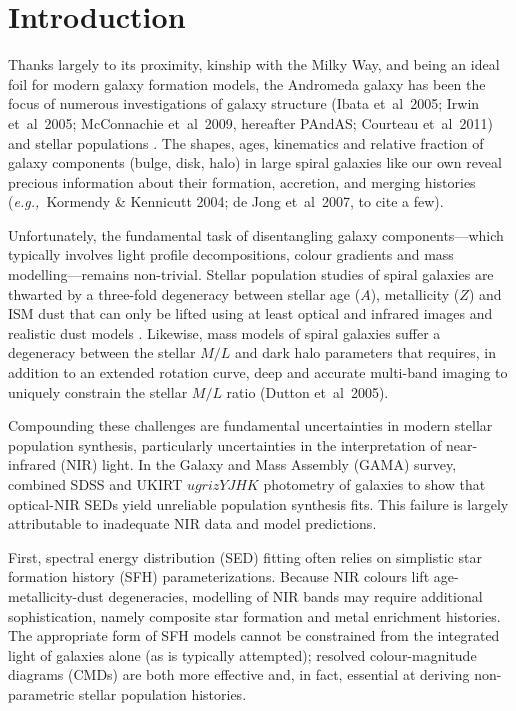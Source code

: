 \documentclass[iop]{emulateapj}
\newcommand{\eg}{\textit{e.g.,~}}
\newcommand{\etal}{et~al~}
\begin{document}
\section{Introduction}
\label{sec:intro}

Thanks largely to its proximity, kinship with the Milky Way, and being an ideal foil for modern galaxy formation models, the Andromeda galaxy has been the focus of numerous investigations of galaxy structure (Ibata \etal 2005; Irwin \etal 2005; McConnachie \etal 2009, hereafter PAndAS; Courteau \etal 2011) and stellar populations \citep{Williams:2002,Worthey:2005,Saglia:2010}.
The shapes, ages, kinematics and relative fraction of galaxy components (bulge, disk, halo) in large spiral galaxies like our own reveal precious information about their formation, accretion, and merging histories (\eg Kormendy \& Kennicutt 2004; de Jong \etal 2007, to cite a few).

Unfortunately, the fundamental task of disentangling galaxy components---which typically involves light profile decompositions, colour gradients and mass modelling---remains non-trivial.
Stellar population studies of spiral galaxies are thwarted by a three-fold degeneracy between stellar age ($A$), metallicity ($Z$) and ISM dust that can only be lifted using at least optical and infrared images and realistic dust models \citep{de-Jong:1996b,MacArthur:2004,Pforr:2012}.
Likewise, mass models of spiral galaxies suffer a degeneracy between the stellar $M/L$ and dark halo parameters that requires, in addition to an extended rotation curve, deep and accurate multi-band imaging to uniquely constrain the stellar $M/L$ ratio (Dutton \etal 2005). 

Compounding these challenges are fundamental uncertainties in modern stellar population synthesis, particularly uncertainties in the interpretation of near-infrared (NIR) light.
In the Galaxy and Mass Assembly (GAMA) survey, \cite{Taylor:2011} combined SDSS and UKIRT $ugrizYJHK$ photometry of galaxies to show that optical-NIR SEDs yield unreliable population synthesis fits.
This failure is largely attributable to inadequate NIR data and model predictions.

First, spectral energy distribution (SED) fitting often relies on simplistic star formation history (SFH) parameterizations.
Because NIR colours lift age-metallicity-dust degeneracies, modelling of NIR bands may require additional sophistication, namely composite star formation and metal enrichment histories.
The appropriate form of SFH models cannot be constrained from the integrated light of galaxies alone (as is typically attempted); resolved colour-magnitude diagrams (CMDs) are both more effective and, in fact, essential at deriving non-parametric stellar population histories. 
\end{document}
